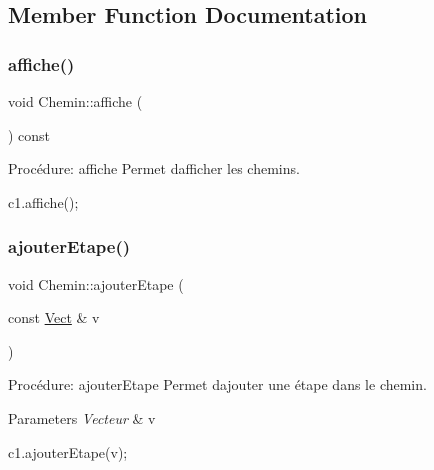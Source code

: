 \subsection{Member Function Documentation}
\mbox{\label{classChemin_a3fdd4a56b105cf6da6e20cd3462583f6}} 
\subsubsection{\texorpdfstring{affiche()}{affiche()}}
{\footnotesize\ttfamily void Chemin\+::affiche (\begin{DoxyParamCaption}{ }\end{DoxyParamCaption}) const}



Procédure\+: affiche Permet d\textquotesingle{}afficher les chemins. 


\begin{DoxyCode}
c1.affiche();
\end{DoxyCode}
 \mbox{\label{classChemin_a4cdbe032bca015c52dccbef4fa2cb647}} 
\subsubsection{\texorpdfstring{ajouter\+Etape()}{ajouterEtape()}}
{\footnotesize\ttfamily void Chemin\+::ajouter\+Etape (\begin{DoxyParamCaption}\item[{const \hyperlink{classVect}{Vect} \&}]{v }\end{DoxyParamCaption})}



Procédure\+: ajouter\+Etape Permet d\textquotesingle{}ajouter une étape dans le chemin. 


\begin{DoxyParams}{Parameters}
{\em Vecteur} & v 
\begin{DoxyCode}
c1.ajouterEtape(v);
\end{DoxyCode}
 \\
\hline
\end{DoxyParams}
\mbox{\label{classChemin_ad01a7ae60fd0b51cc18281c031ea9c97}} 
